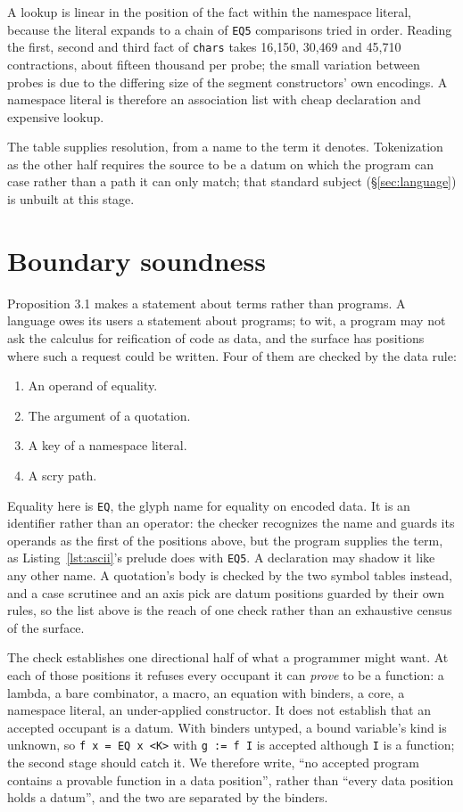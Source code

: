 \documentclass[english,submission,code=tt]{programming}
\begin{document}
A lookup is linear in the position of the fact within the namespace 
literal, because the literal expands to a chain of \texttt{EQ5} 
comparisons tried in order.  Reading the first, second and third fact 
of \texttt{chars} takes 16{,}150, 30{,}469 and 45{,}710 contractions, 
about fifteen thousand per probe; the small variation between probes 
is due to the differing size of the segment constructors' own 
encodings.  A namespace literal is therefore an association list with
cheap declaration and expensive lookup.

The table supplies resolution, from a name to the term it denotes.  
Tokenization as the other half requires the source to be a datum on 
which the program can case rather than a path it can only match; that 
standard subject (\S\ref{sec:language}) is unbuilt at this stage.

\section{Boundary soundness}\label{sec:boundary}

Proposition 3.1 makes a statement about terms rather than programs.  
A language owes its users a statement about programs; to wit, a program 
may not ask the calculus for reification of code as data, and the
surface has positions where such a request could be written.  Four of 
them are checked by the data rule:
\begin{enumerate}[nosep]
  \item  An operand of equality.
  \item  The argument of a quotation.
  \item  A key of a namespace literal.
  \item  A scry path.
\end{enumerate}
Equality here is \texttt{EQ}, the glyph name for equality on encoded
data.  It is an identifier rather
than an operator: the checker recognizes the name and guards its
operands as the first of the positions above, but the program supplies
the term, as
Listing~\ref{lst:ascii}'s prelude does with \texttt{EQ5}.  A
declaration may shadow it like any other name.
A quotation's body is checked by the two symbol tables instead, and a
case scrutinee and an axis pick are datum positions guarded by their own
rules, so the list above is the reach of one check rather than an
exhaustive census of the surface.

The check establishes one directional half of what a programmer might
want.  At each of those positions it refuses every occupant it can
\emph{prove} to be a function: a lambda, a bare combinator, a macro, an
equation with binders, a core, a namespace literal, an under-applied
constructor.  It does not establish that an accepted occupant is a
datum.  With binders untyped, a bound variable's kind is unknown, so
\texttt{f x = EQ x <K>} with \texttt{g := f I} is accepted although
\texttt{I} is a function; the second stage should catch it.
We therefore write, ``no accepted program contains a
provable function in a data position'', rather than ``every data 
position holds a datum'', and the two are separated by the binders.
\end{document}

